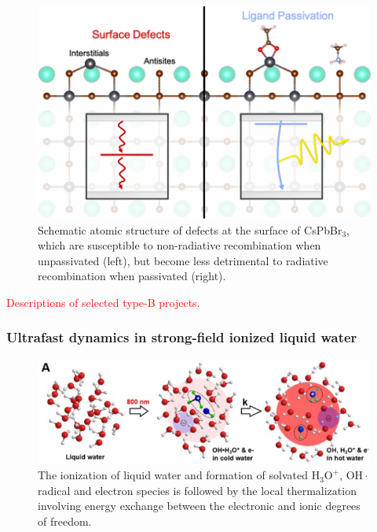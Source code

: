 \begin{figure}[h]
    \centering
    \includegraphics{figures/defect_passivation.png}
    \caption{
        Schematic atomic structure of defects at the surface of CsPbBr$_3$, which are susceptible to non-radiative recombination when unpassivated (left), but become less detrimental to radiative recombination when passivated (right).
    }
    \label{fig:defect}
\end{figure}

\textcolor{red}{Descriptions of selected type-B projects.}
\subsubsection{Ultrafast dynamics in strong-field ionized liquid water} 
\begin{figure}[h]
    \centering
    \includegraphics{figures/Water}
    \caption{
        The ionization of liquid water and formation of solvated \(\mathrm{H_3O^+}\), \(\mathrm{OH\cdot}\) radical and electron species is followed by the local thermalization involving energy exchange between the electronic and ionic degrees of freedom.
    }
    \label{fig:water}
\end{figure}

